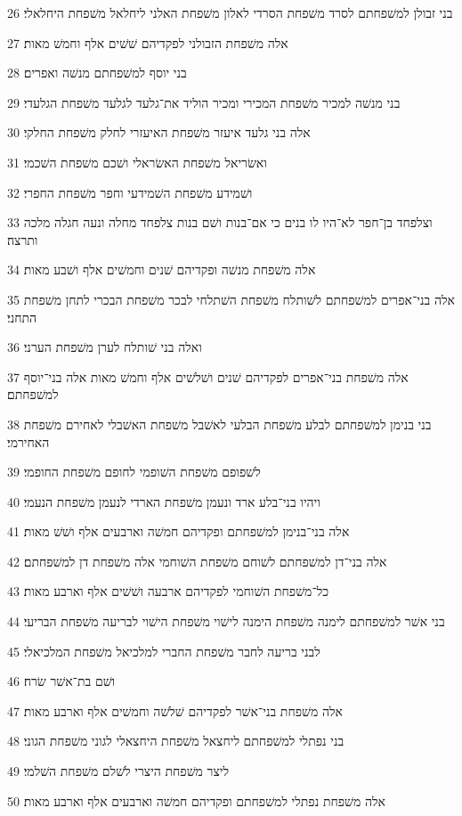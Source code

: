 \par 26 בני זבולן למשׁפחתם לסרד משׁפחת הסרדי לאלון משׁפחת האלני ליחלאל משׁפחת היחלאלי׃
\par 27 אלה משׁפחת הזבולני לפקדיהם שׁשׁים אלף וחמשׁ מאות׃
\par 28 בני יוסף למשׁפחתם מנשׁה ואפרים׃
\par 29 בני מנשׁה למכיר משׁפחת המכירי ומכיר הוליד את־גלעד לגלעד משׁפחת הגלעדי׃
\par 30 אלה בני גלעד איעזר משׁפחת האיעזרי לחלק משׁפחת החלקי׃
\par 31 ואשׂריאל משׁפחת האשׂראלי ושׁכם משׁפחת השׁכמי׃
\par 32 ושׁמידע משׁפחת השׁמידעי וחפר משׁפחת החפרי׃
\par 33 וצלפחד בן־חפר לא־היו לו בנים כי אם־בנות ושׁם בנות צלפחד מחלה ונעה חגלה מלכה ותרצה׃
\par 34 אלה משׁפחת מנשׁה ופקדיהם שׁנים וחמשׁים אלף ושׁבע מאות׃
\par 35 אלה בני־אפרים למשׁפחתם לשׁותלח משׁפחת השׁתלחי לבכר משׁפחת הבכרי לתחן משׁפחת התחני׃
\par 36 ואלה בני שׁותלח לערן משׁפחת הערני׃
\par 37 אלה משׁפחת בני־אפרים לפקדיהם שׁנים ושׁלשׁים אלף וחמשׁ מאות אלה בני־יוסף למשׁפחתם׃
\par 38 בני בנימן למשׁפחתם לבלע משׁפחת הבלעי לאשׁבל משׁפחת האשׁבלי לאחירם משׁפחת האחירמי׃
\par 39 לשׁפופם משׁפחת השׁופמי לחופם משׁפחת החופמי׃
\par 40 ויהיו בני־בלע ארד ונעמן משׁפחת הארדי לנעמן משׁפחת הנעמי׃
\par 41 אלה בני־בנימן למשׁפחתם ופקדיהם חמשׁה וארבעים אלף ושׁשׁ מאות׃
\par 42 אלה בני־דן למשׁפחתם לשׁוחם משׁפחת השׁוחמי אלה משׁפחת דן למשׁפחתם׃
\par 43 כל־משׁפחת השׁוחמי לפקדיהם ארבעה ושׁשׁים אלף וארבע מאות׃
\par 44 בני אשׁר למשׁפחתם לימנה משׁפחת הימנה לישׁוי משׁפחת הישׁוי לבריעה משׁפחת הבריעי׃
\par 45 לבני בריעה לחבר משׁפחת החברי למלכיאל משׁפחת המלכיאלי׃
\par 46 ושׁם בת־אשׁר שׂרח׃
\par 47 אלה משׁפחת בני־אשׁר לפקדיהם שׁלשׁה וחמשׁים אלף וארבע מאות׃
\par 48 בני נפתלי למשׁפחתם ליחצאל משׁפחת היחצאלי לגוני משׁפחת הגוני׃
\par 49 ליצר משׁפחת היצרי לשׁלם משׁפחת השׁלמי׃
\par 50 אלה משׁפחת נפתלי למשׁפחתם ופקדיהם חמשׁה וארבעים אלף וארבע מאות׃
